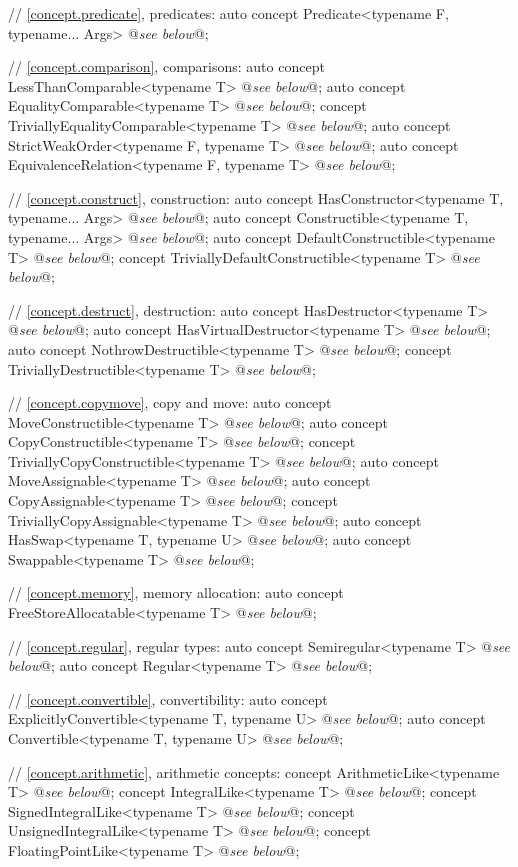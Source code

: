 \documentclass[american,twoside]{book}
\begin{document}
\begin{codeblock}
{  // \ref{concept.predicate}, predicates:
  auto concept Predicate<typename F, typename... Args> @\textit{see below}@;

  // \ref{concept.comparison}, comparisons:
  auto concept LessThanComparable<typename T> @\textit{see below}@;
  auto concept EqualityComparable<typename T> @\textit{see below}@;
  concept TriviallyEqualityComparable<typename T> @\textit{see below}@;
  auto concept StrictWeakOrder<typename F, typename T> @\textit{see below}@;
  auto concept EquivalenceRelation<typename F, typename T> @\textit{see below}@;

  // \ref{concept.construct}, construction:
  auto concept HasConstructor<typename T, typename... Args> @\textit{see below}@;
  auto concept Constructible<typename T, typename... Args> @\textit{see below}@;
  auto concept DefaultConstructible<typename T> @\textit{see below}@;
  concept TriviallyDefaultConstructible<typename T> @\textit{see below}@;

  // \ref{concept.destruct}, destruction:
  auto concept HasDestructor<typename T> @\textit{see below}@;
  auto concept HasVirtualDestructor<typename T> @\textit{see below}@;
  auto concept NothrowDestructible<typename T> @\textit{see below}@;
  concept TriviallyDestructible<typename T> @\textit{see below}@;

  // \ref{concept.copymove}, copy and move:
  auto concept MoveConstructible<typename T> @\textit{see below}@;
  auto concept CopyConstructible<typename T> @\textit{see below}@;
  concept TriviallyCopyConstructible<typename T> @\textit{see below}@;
  auto concept MoveAssignable<typename T> @\textit{see below}@;
  auto concept CopyAssignable<typename T> @\textit{see below}@;
  concept TriviallyCopyAssignable<typename T> @\textit{see below}@;
  auto concept HasSwap<typename T, typename U> @\textit{see below}@;
  auto concept Swappable<typename T> @\textit{see below}@;

  // \ref{concept.memory}, memory allocation:
  auto concept FreeStoreAllocatable<typename T> @\textit{see below}@;

  // \ref{concept.regular}, regular types:
  auto concept Semiregular<typename T> @\textit{see below}@;
  auto concept Regular<typename T> @\textit{see below}@;

  // \ref{concept.convertible}, convertibility:
  auto concept ExplicitlyConvertible<typename T, typename U> @\textit{see below}@;
  auto concept Convertible<typename T, typename U> @\textit{see below}@;


  // \ref{concept.arithmetic}, arithmetic concepts:
  concept ArithmeticLike<typename T> @\textit{see below}@;
  concept IntegralLike<typename T> @\textit{see below}@;
  concept SignedIntegralLike<typename T> @\textit{see below}@;
  concept UnsignedIntegralLike<typename T> @\textit{see below}@;
  concept FloatingPointLike<typename T> @\textit{see below}@;
}
\end{codeblock}
\end{document}

